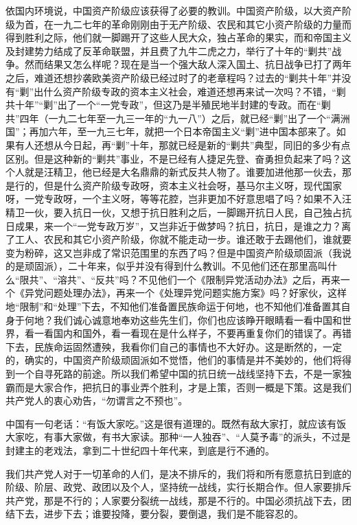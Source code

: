 \documentclass[UTF8, 12pt, a4paper]{ctexrep}
\begin{document}
依国内环境说，中国资产阶级应该获得了必要的教训。中国资产阶级，以大资产阶级为首，在一九二七年的革命刚刚由于无产阶级、农民和其它小资产阶级的力量而得到胜利之际，他们就一脚踢开了这些人民大众，独占革命的果实，而和帝国主义及封建势力结成了反革命联盟，并且费了九牛二虎之力，举行了十年的“剿共”战争。然而结果又怎么样呢？现在是当一个强大敌人深入国土、抗日战争已打了两年之后，难道还想抄袭欧美资产阶级已经过时了的老章程吗？过去的“剿共十年”并没有“剿”出什么资产阶级专政的资本主义社会，难道还想再来试一次吗？不错，“剿共十年”“剿”出了一个“一党专政”，但这乃是半殖民地半封建的专政。而在“剿共”四年（一九二七年至一九三一年的“九一八”）之后，就已经“剿”出了一个“满洲国”；再加六年，至一九三七年，就把一个日本帝国主义“剿”进中国本部来了。如果有人还想从今日起，再“剿”十年，那就已经是新的“剿共”典型，同旧的多少有点区别。但是这种新的“剿共”事业，不是已经有人捷足先登、奋勇担负起来了吗？这个人就是汪精卫，他已经是大名鼎鼎的新式反共人物了。谁要加进他那一伙去，那是行的，但是什么资产阶级专政呀，资本主义社会呀，基马尔主义呀，现代国家呀，一党专政呀，一个主义呀，等等花腔，岂非更加不好意思唱了吗？如果不入汪精卫一伙，要入抗日一伙，又想于抗日胜利之后，一脚踢开抗日人民，自己独占抗日成果，来一个“一党专政万岁”，又岂非近于做梦吗？抗日，抗日，是谁之力？离了工人、农民和其它小资产阶级，你就不能走动一步。谁还敢于去踢他们，谁就要变为粉碎，这又岂非成了常识范围里的东西了吗？但是中国资产阶级顽固派（我说的是顽固派），二十年来，似乎并没有得到什么教训。不见他们还在那里高叫什么“限共”、“溶共”、“反共”吗？不见他们一个《限制异党活动办法》之后，再来一个《异党问题处理办法》，再来一个《处理异党问题实施方案》吗？好家伙，这样地“限制”和“处理”下去，不知他们准备置民族命运于何地，也不知他们准备置其自身于何地？我们诚心诚意地奉劝这些先生们，你们也应该睁开眼睛看一看中国和世界，看一看国内和国外，看一看现在是什么样子，不要再重复你们的错误了。再错下去，民族命运固然遭殃，我看你们自己的事情也不大好办。这是断然的，一定的，确实的，中国资产阶级顽固派如不觉悟，他们的事情是并不美妙的，他们将得到一个自寻死路的前途。所以我们希望中国的抗日统一战线坚持下去，不是一家独霸而是大家合作，把抗日的事业弄个胜利，才是上策，否则一概是下策。这是我们共产党人的衷心劝告，“勿谓言之不预也”。

中国有一句老话：“有饭大家吃。”这是很有道理的。既然有敌大家打，就应该有饭大家吃，有事大家做，有书大家读。那种“一人独吞”、“人莫予毒”的派头，不过是封建主的老戏法，拿到二十世纪四十年代来，到底是行不通的。

我们共产党人对于一切革命的人们，是决不排斥的，我们将和所有愿意抗日到底的阶级、阶层、政党、政团以及个人，坚持统一战线，实行长期合作。但人家要排斥共产党，那是不行的；人家要分裂统一战线，那是不行的。中国必须抗战下去，团结下去，进步下去；谁要投降，要分裂，要倒退，我们是不能容忍的。
\end{document}
